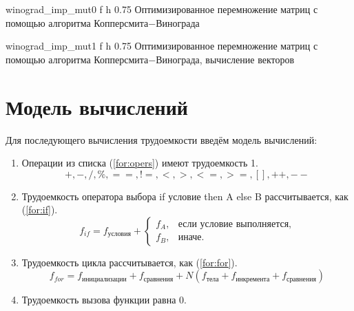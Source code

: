 {winograd_imp_mut0} %
{f} %
{h} %
{0.75\textwidth} %
{Оптимизированное перемножение матриц с помощью алгоритма Копперсмита$-$Винограда} %
\clearpage

{winograd_imp_mut1} %
{f} %
{h} %
{0.75\textwidth} %
{Оптимизированное перемножение матриц с помощью алгоритма Копперсмита$-$Винограда, вычисление векторов} %
\clearpage

\section{Модель вычислений}

Для последующего вычисления трудоемкости введём модель вычислений:

\begin{enumerate}
    \item Операции из списка (\ref{for:opers}) имеют трудоемкость 1.
    \begin{equation}
        \label{for:opers}
        +, -, /, \%, ==, !=, <, >, <=, >=, [], ++, {-}-
    \end{equation}
    \item Трудоемкость оператора выбора if условие then A else B рассчитывается, как (\ref{for:if}).
    \begin{equation}
        \label{for:if}
        f_{if} = f_{\text{условия}} +
        \begin{cases}
            f_A, & \text{если условие выполняется,}\\
            f_B, & \text{иначе.}
        \end{cases}
    \end{equation}
    \item Трудоемкость цикла рассчитывается, как (\ref{for:for}).
    \begin{equation}
        \label{for:for}
        f_{for} = f_{\text{инициализации}} + f_{\text{сравнения}} + N(f_{\text{тела}} + f_{\text{инкремента}} + f_{\text{сравнения}})
    \end{equation}
    \item Трудоемкость вызова функции равна 0.
\end{enumerate}

